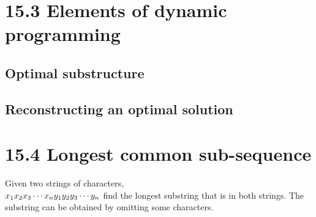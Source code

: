 \documentclass[a4paper]{article}
\begin{document}
\section*{15.3 Elements of dynamic programming}
\subsection*{Optimal substructure}
\subsection*{Reconstructing an optimal solution}

\section*{15.4 Longest common sub-sequence}
Given two strings of characters,\\
$
x_1x_2x_3\cdots x_n\\
y_1y_2y_3\cdots y_n\\
$
find the longest substring that is in both strings. The substring can be obtained by omitting some characters.
\end{document}
